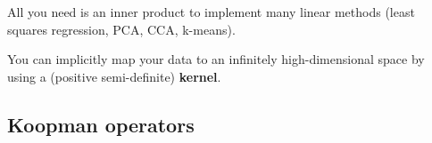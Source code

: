 \documentclass[a4paper,11pt]{exam}
\newcounter{ct}
\begin{document}
All you need is an inner product to implement many linear methods (least squares regression, PCA, CCA, k-means).

\begin{tcolorbox}[colback=black!1!,title=Kernel Trick]
You can implicitly map your data to an infinitely high-dimensional space by using a (positive semi-definite) \textbf{kernel}.
\end{tcolorbox}

\subsection{Koopman operators}



\end{document}
